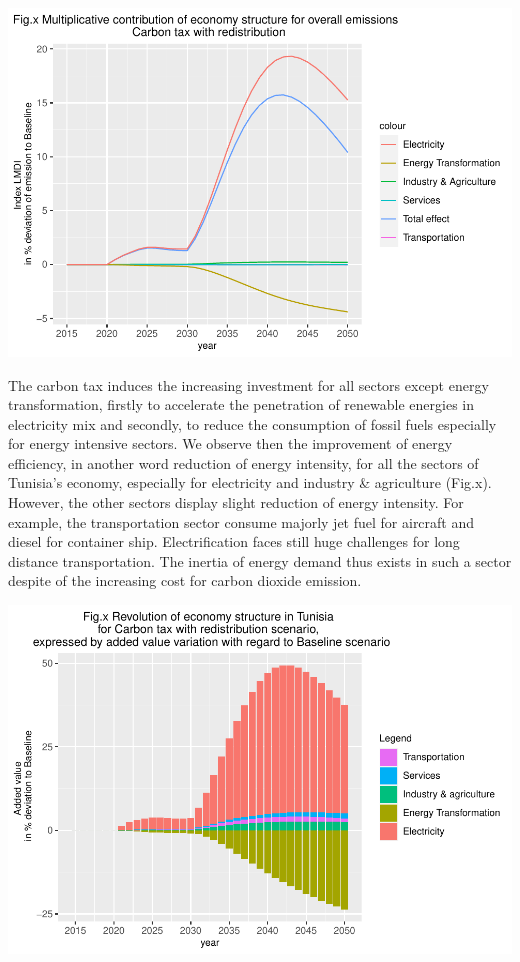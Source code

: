 \documentclass[
]{article}
\begin{document}
\begin{center}\includegraphics[width=0.7\linewidth,height=0.7\textheight]{Modele-ThreeMe-Tunisie_Sequeira_Valilou_Wang_files/figure-latex/unnamed-chunk-22-1} \end{center}

The carbon tax induces the increasing investment for all sectors except
energy transformation, firstly to accelerate the penetration of
renewable energies in electricity mix and secondly, to reduce the
consumption of fossil fuels especially for energy intensive sectors. We
observe then the improvement of energy efficiency, in another word
reduction of energy intensity, for all the sectors of Tunisia's economy,
especially for electricity and industry \& agriculture (Fig.x). However,
the other sectors display slight reduction of energy intensity. For
example, the transportation sector consume majorly jet fuel for aircraft
and diesel for container ship. Electrification faces still huge
challenges for long distance transportation. The inertia of energy
demand thus exists in such a sector despite of the increasing cost for
carbon dioxide emission.

\begin{center}\includegraphics[width=0.7\linewidth,height=0.7\textheight]{Modele-ThreeMe-Tunisie_Sequeira_Valilou_Wang_files/figure-latex/unnamed-chunk-23-1} \end{center}
\end{document}
